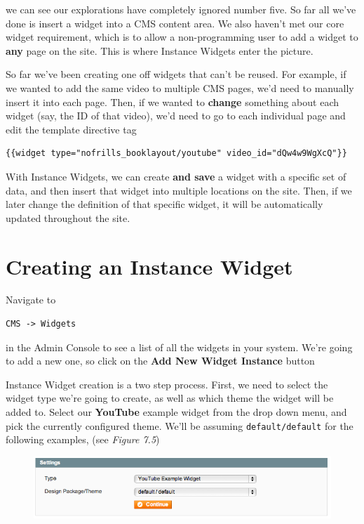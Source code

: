 \documentclass[oneside]{book}
\begin{document}
we can see our explorations have completely ignored number five.  So far all we've done is insert a widget into a CMS content area.  We also haven't met our core widget requirement, which is to allow a non-programming user to add a widget to \textbf{any} page on the site. This is where Instance Widgets enter the picture.

So far we've been creating one off widgets that can't be reused.  For example, if we wanted to add the same video to multiple CMS pages, we'd need to manually insert it into each page.  Then, if we wanted to \textbf{change} something about each widget (say, the ID of that video), we'd need to go to each individual page and edit the template directive tag

\begin{lstlisting}
{{widget type="nofrills_booklayout/youtube" video_id="dQw4w9WgXcQ"}}

\end{lstlisting}


With Instance Widgets, we can create \textbf{and save} a widget with a specific set of data, and then insert that widget into multiple locations on the site.  Then, if we later change the definition of that specific widget, it will be automatically updated throughout the site.

\section{Creating an Instance Widget}

Navigate to

\begin{lstlisting}
CMS -> Widgets

\end{lstlisting}


in the Admin Console to see a list of all the widgets in your system.  We're going to add a new one, so click on the \textbf{Add New Widget Instance} button

Instance Widget creation is a two step process.  First, we need to select the widget type we're going to create, as well as which theme the widget will be added to.  Select our \textbf{YouTube} example widget from the drop down menu, and pick the currently configured theme.  We'll be assuming \footnotesize\texttt{default/default} \normalsize  for the following examples, (see \emph{Figure 7.5})

\begin{figure}[htb]
\begin{center}
\leavevmode
\includegraphics[width=1\textwidth]{images/chapter7/instance-step1.png}
\end{center}
\caption{}
\end{figure}
\end{document}
